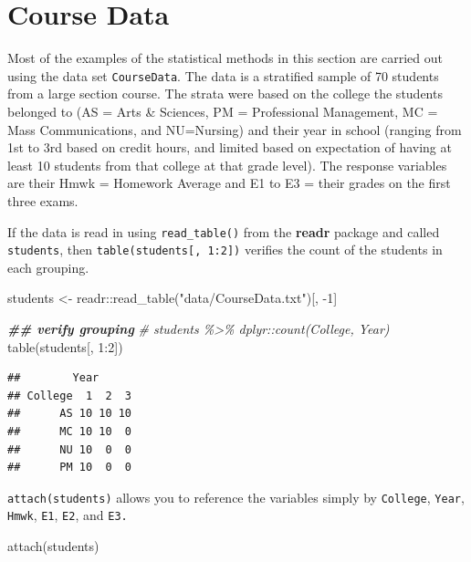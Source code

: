 \documentclass[
]{book}
\newenvironment{Shaded}{\begin{snugshade}}{\end{snugshade}}
\newcommand{\CommentTok}[1]{\textcolor[rgb]{0.56,0.35,0.01}{\textit{#1}}}
\newcommand{\DecValTok}[1]{\textcolor[rgb]{0.00,0.00,0.81}{#1}}
\newcommand{\DocumentationTok}[1]{\textcolor[rgb]{0.56,0.35,0.01}{\textbf{\textit{#1}}}}
\newcommand{\FunctionTok}[1]{\textcolor[rgb]{0.00,0.00,0.00}{#1}}
\newcommand{\NormalTok}[1]{#1}
\newcommand{\OtherTok}[1]{\textcolor[rgb]{0.56,0.35,0.01}{#1}}
\newcommand{\SpecialCharTok}[1]{\textcolor[rgb]{0.00,0.00,0.00}{#1}}
\newcommand{\StringTok}[1]{\textcolor[rgb]{0.31,0.60,0.02}{#1}}
\begin{document}
\hypertarget{course-data}{%
\section*{Course Data}\label{course-data}}

Most of the examples of the statistical methods in this section are carried out using the data set \texttt{CourseData}. The data is a stratified sample of 70 students from a large section course. The strata were based on the college the students belonged to (AS = Arts \& Sciences, PM = Professional Management, MC = Mass Communications, and NU=Nursing) and their year in school (ranging from 1st to 3rd based on credit hours, and limited based on expectation of having at least 10 students from that college at that grade level). The response variables are their Hmwk = Homework Average and E1 to E3 = their grades on the first three exams.

If the data is read in using \texttt{read\_table()} from the \textbf{readr} package and called \texttt{students}, then \texttt{table(students{[},\ 1:2{]})} verifies the count of the students in each grouping.

\begin{Shaded}
\begin{Highlighting}[]
\NormalTok{students }\OtherTok{\textless{}{-}}\NormalTok{ readr}\SpecialCharTok{::}\FunctionTok{read\_table}\NormalTok{(}\StringTok{"data/CourseData.txt"}\NormalTok{)[, }\SpecialCharTok{{-}}\DecValTok{1}\NormalTok{]}

\DocumentationTok{\#\# verify grouping}
\CommentTok{\# students \%\textgreater{}\% dplyr::count(College, Year)}
\FunctionTok{table}\NormalTok{(students[, }\DecValTok{1}\SpecialCharTok{:}\DecValTok{2}\NormalTok{])}
\end{Highlighting}
\end{Shaded}

\begin{verbatim}
##        Year
## College  1  2  3
##      AS 10 10 10
##      MC 10 10  0
##      NU 10  0  0
##      PM 10  0  0
\end{verbatim}

\texttt{attach(students)} allows you to reference the variables simply by \texttt{College}, \texttt{Year}, \texttt{Hmwk}, \texttt{E1}, \texttt{E2}, and \texttt{E3.}

\begin{Shaded}
\begin{Highlighting}[]
\FunctionTok{attach}\NormalTok{(students)}
\end{Highlighting}
\end{Shaded}
\end{document}
